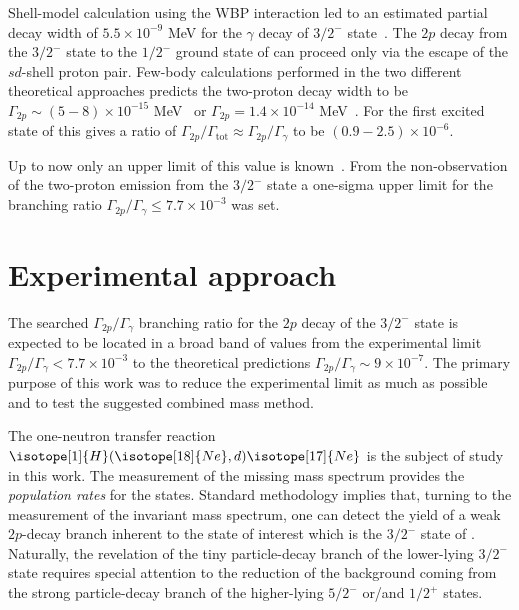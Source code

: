 \documentclass[superscriptaddress,showpacs,showkeys,twoside,floatfix,twocolumn]
{revtex4-1}
\begin{document}
Shell-model calculation using the WBP interaction led to an estimated
partial decay width of $5.5 \times 10^{-9}$ MeV for the $\gamma$ decay of
 $3/2^-$ state~\cite{Chromik:1997}.
The \(2p\) decay from the $3/2^-$ state to the $1/2^-$ ground state of
 can proceed only via the escape of the $sd$-shell proton pair.
Few-body calculations performed in the two different theoretical approaches
predicts the two-proton decay width to be
$\Gamma_{2p}\sim (5-8) \times 10^{-15}$ MeV~\cite{Grigorenko:2007} or
$\Gamma_{2p}=1.4 \times 10^{-14}$ MeV~\cite{Garrido:2008}.
For
the first excited state of  this gives a ratio of
$\Gamma_{2p}/\Gamma_{\mathrm{tot}} \approx \Gamma_{2p}/\Gamma_{\gamma}$
to be $(0.9-2.5)\times 10^{-6}$.

Up to now only an upper limit of this value is known~\cite{Chromik:2002}.
From the non-observation of the two-proton emission from the $3/2^-$ state
a one-sigma upper limit for
the branching ratio $\Gamma_{2p}/\Gamma_{\gamma} \le 7.7\times 10^{-3}$ was set.



\section{Experimental approach}
\label{sec:approach}



The searched $\Gamma_{2p}/\Gamma_{\gamma}$ branching ratio for the $2p$ decay of
the  $3/2^-$ state is expected to be located in a broad band of
values from the experimental limit
$\Gamma_{2p}/\Gamma_{\gamma} < 7.7\times 10^{-3}$
to the theoretical predictions
$\Gamma_{2p}/\Gamma_{\gamma} \sim 9\times 10^{-7}$.
The primary purpose of this work was to reduce the experimental limit
as much as possible and to test the suggested combined mass method.


The one-neutron transfer reaction
\(\isotope[1]{H}(\isotope[18]{Ne},d)\isotope[17]{Ne}\)
is the subject of study in this work.
The measurement of the missing mass spectrum provides the
\emph{population rates} for the  states.
Standard methodology implies that,
turning to the measurement of the invariant mass spectrum,
one can detect the yield of a weak \(2p\)-decay branch inherent to
the state of interest which is the \(3/2^-\) state of .
Naturally, the revelation of the tiny particle-decay branch of the lower-lying
$3/2^-$ state requires special attention to the reduction of the background
coming from the strong particle-decay branch of the higher-lying \(5/2^-\)
or/and \(1/2^+\) states.
\end{document}
